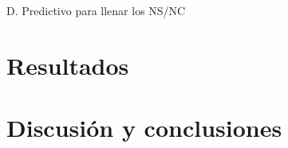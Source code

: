 \documentclass[10pt, spanish]{article}
\begin{document}
D. Predictivo para llenar los NS/NC  

\section{Resultados}\label{res}

\section{Discusión y conclusiones}\label{conc}















\newpage


\end{document}
